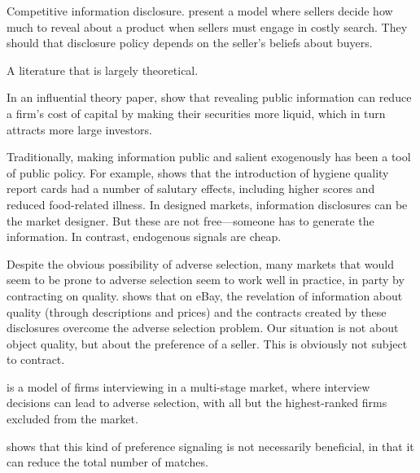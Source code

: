 Competitive information disclosure.
\cite{board2015competitive} present a model where sellers decide how much to reveal about a product when sellers must engage in costly search.
They should that disclosure policy depends on the seller's beliefs about buyers. 

A literature that is largely theoretical. 

\cite{budish2011}
\cite{cho2014}
\cite{day1976}
\cite{Silva2008}

In an influential theory paper, \cite{Diamond1991} show that revealing public information can reduce a firm's cost of capital by making their securities more liquid, which in turn attracts more large investors. 


\cite{gilson1984}
\cite{grossman1981}
\cite{healy2001}

Traditionally, making information public and salient exogenously has been a tool of public policy. For example, \cite{jin2003} shows that the introduction of hygiene quality report cards had a number of salutary effects, including higher scores and reduced food-related illness.
In designed markets, information disclosures can be the market designer.
But these are not free---someone has to generate the information.
In contrast, endogenous signals are cheap. 

\cite{johnson2006}
\cite{levin1996}

Despite the obvious possibility of adverse selection, many markets that would seem to be prone to adverse selection seem to work well in practice, in party by contracting on quality.
\cite{lewis2011} shows that on eBay, the revelation of information about quality (through descriptions and prices) and the contracts created by these disclosures overcome the adverse selection problem.
Our situation is not about object quality, but about the preference of a seller.
This is obviously not subject to contract. 

\cite{milgrom1981}
\cite{Milgrom1982}
\cite{overby2009}
\cite{porter1995}
\cite{roberts2014}
\cite{lee2009interviewing}

\cite{ely2013adverse}is a model of firms interviewing in a multi-stage market, where interview decisions can lead to adverse selection, with all but the highest-ranked firms excluded from the market. 


\cite{lee2011propose}
\cite{kushnir2013harmful} shows that this kind of preference signaling is not necessarily beneficial, in that it can reduce the total number of matches. 


